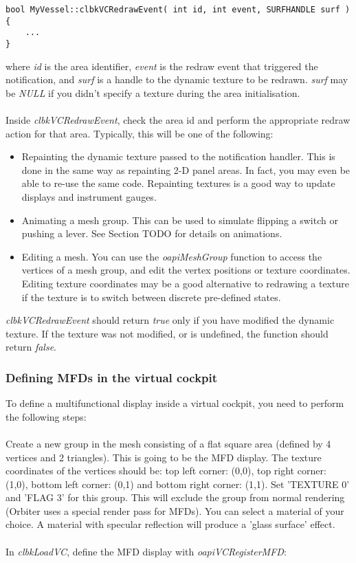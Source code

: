 \documentclass[Orbiter Developer Manual.tex]{subfiles}
\begin{document}
\begin{lstlisting}
bool MyVessel::clbkVCRedrawEvent( int id, int event, SURFHANDLE surf )
{
	...
}
\end{lstlisting}

\noindent
where \textit{id} is the area identifier, \textit{event} is the redraw event that triggered the notification, and \textit{surf} is a handle to the dynamic texture to be redrawn. \textit{surf} may be \textit{NULL} if you didn't specify a texture during the area initialisation.\\
\\
Inside \textit{clbkVCRedrawEvent}, check the area id and perform the appropriate redraw action for that area. Typically, this will be one of the following:

\begin{itemize}
\item Repainting the dynamic texture passed to the notification handler. This is done in the same way as repainting 2-D panel areas. In fact, you may even be able to re-use the same code. Repainting textures is a good way to update displays and instrument gauges.
\item Animating a mesh group. This can be used to simulate flipping a switch or pushing a lever. See Section TODO for details on animations.
\item Editing a mesh. You can use the \textit{oapiMeshGroup} function to access the vertices of a mesh group, and edit the vertex positions or texture coordinates. Editing texture coordinates may be a good alternative to redrawing a texture if the texture is to switch between discrete pre-defined states.
\end{itemize}

\noindent
\textit{clbkVCRedrawEvent} should return \textit{true} only if you have modified the dynamic texture. If the texture was not modified, or is undefined, the function should return \textit{false}.


\subsubsection{Defining MFDs in the virtual cockpit}
To define a multifunctional display inside a virtual cockpit, you need to perform the following steps:\\
\\
Create a new group in the mesh consisting of a flat square area (defined by 4 vertices and 2 triangles). This is going to be the MFD display. The texture coordinates of the vertices should be: top left corner: (0,0), top right corner: (1,0), bottom left corner: (0,1) and bottom right corner: (1,1). Set 'TEXTURE 0' and 'FLAG 3' for this group. This will exclude the group from normal rendering (Orbiter uses a special render pass for MFDs). You can select a material of your choice. A material with specular reflection will produce a 'glass surface' effect.\\
\\
In \textit{clbkLoadVC}, define the MFD display with \textit{oapiVCRegisterMFD}:
\end{document}
